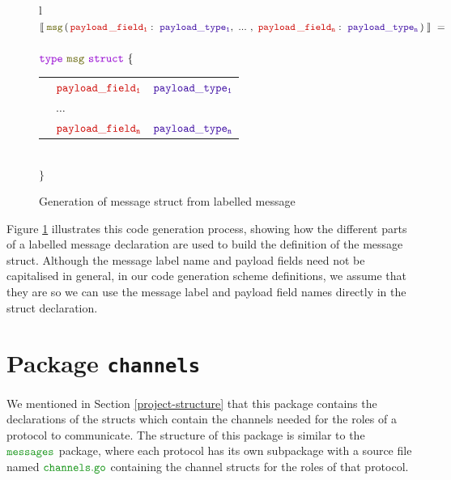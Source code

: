 \documentclass[12pt,twoside]{report}
\begin{document}
\begin{figure}[!h]
    \begin{center}
        \begin{tabular}{l}
            $\llbracket\;\structname{msg}\,(\,\payloaddecl{payload\,\_field}{payload\_type}{n}\,)\;\rrbracket\ = $\\\\
        
            $\gotype\ \structname{msg}\ \gostruct\ \{$\\[3pt]
            \begin{tabular}{lll}
                \indent & $\structfield{payload\_field_1}$ & $\typename{payload\_type_1}$\\
                \indent & $\dots$ &\\
                \indent & $\structfield{payload\_field_n}$ & $\typename{payload\_type_n}$
            \end{tabular}\\
        
            $\}$
        \end{tabular}
    \end{center}
    \caption{Generation of message struct from labelled message}
    \label{msg-struct-codegen}
\end{figure}

Figure \ref{msg-struct-codegen} illustrates this code generation process, showing how the different parts of a labelled message declaration are used to build the definition of the message struct. Although the message label name and payload fields need not be capitalised in general, in our code generation scheme definitions, we assume that they are so we can use the message label and payload field names directly in the struct declaration.\\

\section{Package \texttt{channels}}
We mentioned in Section \ref{project-structure} that this package contains the declarations of the structs which contain the channels needed for the roles of a protocol to communicate. The structure of this package is similar to the $\pkgname{messages}$ package, where each protocol has its own subpackage with a source file named $\filename{channels}$ containing the channel structs for the roles of that protocol.\\
\end{document}
